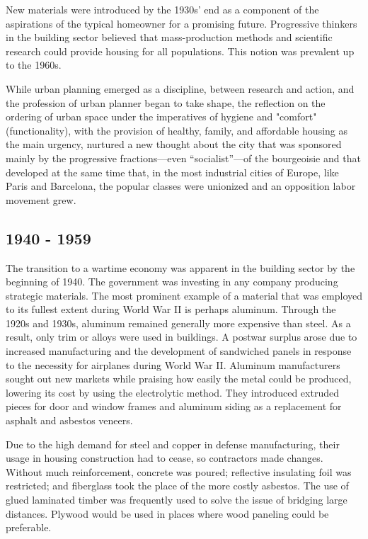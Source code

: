 New materials were introduced by the 1930s' end as a component of the aspirations of the typical homeowner for a promising future. Progressive thinkers in the building sector believed that mass-production methods and scientific research could provide housing for all populations. This notion was prevalent up to the 1960s.

While urban planning emerged as a discipline, between research and action, and the profession of urban planner began to take shape, the reflection on the ordering of urban space under the imperatives of hygiene and "comfort" (functionality), with the provision of healthy, family, and affordable housing as the main urgency, nurtured a new thought about the city that was sponsored mainly by the progressive fractions—even “socialist”—of the bourgeoisie and that developed at the same time that, in the most industrial cities of Europe, like Paris and Barcelona, the popular classes were unionized and an opposition labor movement grew.

\subsection{1940 - 1959}
\label{sec:1900-1919}

The transition to a wartime economy was apparent in the building sector by the beginning of 1940. The government was investing in any company producing strategic materials. The most prominent example of a material that was employed to its fullest extent during World War II is perhaps aluminum. Through the 1920s and 1930s, aluminum remained generally more expensive than steel. As a result, only trim or alloys were used in buildings. A postwar surplus arose due to increased manufacturing and the development of sandwiched panels in response to the necessity for airplanes during World War II. Aluminum manufacturers sought out new markets while praising how easily the metal could be produced, lowering its cost by using the electrolytic method. They introduced extruded pieces for door and window frames and aluminum siding as a replacement for asphalt and asbestos veneers.

Due to the high demand for steel and copper in defense manufacturing, their usage in housing construction had to cease, so contractors made changes. Without much reinforcement, concrete was poured; reflective insulating foil was restricted; and fiberglass took the place of the more costly asbestos. The use of glued laminated timber was frequently used to solve the issue of bridging large distances. Plywood would be used in places where wood paneling could be preferable.

